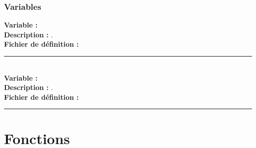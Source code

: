 \documentclass[a4paper,10pt]{article}
\begin{document}
\color{blue}
\subsubsection{Variables}\color{white}
\textbf{Variable :} \textbf{\color{orange}\color{white}}\\[1\baselineskip]

\textbf{Description :} .\\[1\baselineskip]

\textbf{Fichier de définition :} \textbf{\color{lime}\color{white}}\\[1\baselineskip]




\par\noindent\rule{\textwidth}{0.4pt}\\[1\baselineskip]

\textbf{Variable :} \textbf{\color{orange}\color{white}}\\[1\baselineskip]

\textbf{Description :} .\\[1\baselineskip]

\textbf{Fichier de définition :} \textbf{\color{lime}\color{white}}\\[1\baselineskip]



\color{red}\par\noindent\rule{\textwidth}{0.4pt}\color{white}

\color{red}
\section{Fonctions}\color{white}

\color{green}
\subsection{}\color{white}
\end{document}

